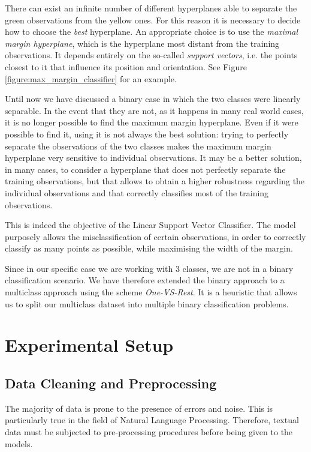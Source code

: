 \documentclass[letterpaper,11pt]{article}
\begin{document}
There can exist an infinite number of different hyperplanes able to separate the green observations from the yellow ones. For this reason it is necessary to decide how to choose the \textit{best} hyperplane. An appropriate choice is to use the \textit{maximal margin hyperplane}, which is the hyperplane most distant from the training observations. It depends entirely on the so-called \textit{support vectors}, i.e. the points closest to it that influence its position and orientation. See Figure \ref{figure:max_margin_classifier} for an example.

Until now we have discussed a binary case in which the two classes were linearly separable. In the event that they are not, as it happens in many real world cases, it is no longer possible to find the maximum margin hyperplane. Even if it were possible to find it, using it is not always the best solution: trying to perfectly separate the observations of the two classes makes the maximum margin hyperplane very sensitive to individual observations. It may be a better solution, in many cases, to consider a hyperplane that does not perfectly separate the training observations, but that allows to obtain a higher robustness regarding the individual observations and that correctly classifies most of the training observations.

This is indeed the objective of the Linear Support Vector Classifier. The model purposely allows the misclassification of certain observations, in order to correctly classify as many points as possible, while maximising the width of the margin.

Since in our specific case we are working with 3 classes, we are not in a binary classification scenario. We have therefore extended the binary approach to a multiclass approach using the scheme \textit{One-VS-Rest}. It is a heuristic that allows us to split our multiclass dataset into multiple binary classification problems.


\newpage
\section{Experimental Setup}

\subsection{Data Cleaning and Preprocessing}

The majority of data is prone to the presence of errors and noise. This is particularly true in the field of Natural Language Processing. Therefore, textual data must be subjected to pre-processing procedures before being given to the models. 
\end{document}
